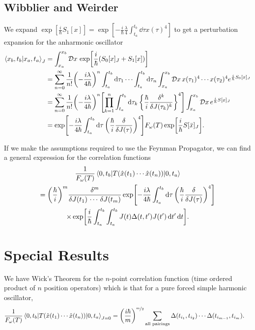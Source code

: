 \documentclass[]{revision-notes}
\begin{document}
\subsection{Wibblier and Weirder}
We expand \(\exp[\frac{i}{\hbar} S_1[x]] = \exp[-\frac{i}{\hbar} \frac{ \lambda }{4}\int_{t_a}^{t_b} \dd{\tau} x(\tau)^4]\) to get a perturbation expansion for the anharmonic oscillator
\begin{align*}
  \braket{x_b, t_b}{x_a, t_a}_J &= \int_{x_a}^{x_b} \DD{x} \exp[\frac{i}{\hbar}(S_0[x]_J + S_1[x])]\\
  &= \sum_{n=0}^{\infty} \frac{1}{n!} \qty(-\frac{i\lambda}{4\hbar})^n \int_{t_a}^{t_b} \dd{\tau_1} \cdots \int_{t_a}^{t_b} \dd{\tau_n}  \int_{x_a}^{x_b} \DD{x} x(\tau_1)^4 \cdots x(\tau_2)^4 e^{\frac{i}{\hbar} S_0[x]_J} \\
  &= \sum_{n=0}^{\infty} \frac{1}{n!} \qty(-\frac{i\lambda}{4\hbar})^n \qty[\prod_{k=1}^n \int_{t_a}^{t_b} \dd{\tau_k} \qty{\frac{\hbar}{i}\fdv[k]{J(\tau_k)}}^4] \int_{x_a}^{x_b} \DD{x}  e^{\frac{i}{\hbar} S[x]_J}\\
  &= \exp[-\frac{i\lambda}{4\hbar} \int_{t_a}^{t_b} \dd{\tau} \qty(\frac{\hbar}{i}\fdv{J(\tau)})^4] F_\omega(T) \exp[\frac{i}{\hbar} S[\bar{x}]_J].
\end{align*}

If we make the assumptions required to use the Feynman Propagator, we can find a general expression for the correlation functions
\begin{multline*}
  \frac{1}{F_\omega(T)} \mel{0, t_b}{T(\hat{x}(t_1)\cdots\hat{x}(t_n))}{0, t_a} \\= \qty(\frac{\hbar}{i})^m \frac{\delta^m}{\delta J(t_1)\,\cdots\,\delta J(t_m)} \exp[-\frac{i\lambda}{4\hbar} \int_{t_a}^{t_b} \dd{\tau} \qty(\frac{\hbar}{i}\fdv{J(\tau)})^4]\\
  \times \exp[\frac{i}{\hbar} \int_{t_a}^{t_b}\int_{t_a}^{t_b}J(t)\Delta(t, t^\prime)J(t^\prime)\dd{t^\prime}\dd{t}].
\end{multline*}

\section{Special Results}
We have Wick's Theorem for the \( n\)-point correlation function (time ordered product of \(n\) position operators) which is that for a pure forced simple harmonic oscillator,
\begin{align*}
  \frac{1}{F_\omega (T)} \mel{0, t_b}{T(\hat{x}(t_1) \cdots \hat{x}(t_n))}{0, t_a}_{J=0} &= \qty(\frac{i\hbar}{m})^{\nicefrac{m}{2}} \sum_{\text{all pairings}}\Delta(t_{i_1}, t_{i_2})\cdots \Delta(t_{i_{m-1}}, t_{i_m}).
\end{align*}
\end{document}
